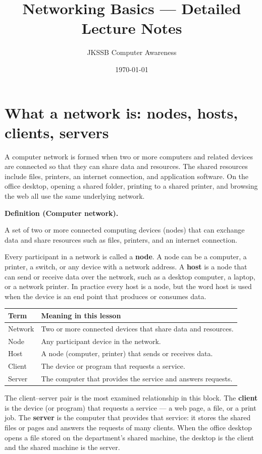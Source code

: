 \documentclass[11pt]{article}
\title{Networking Basics --- Detailed Lecture Notes}
\author{JKSSB Computer Awareness}
\date{\today}
\newenvironment{definitionbox}[1]{%
  \par\noindent\textbf{Definition (#1).}\ \itshape
}{\par\vspace{0.3em}}
\begin{document}
\maketitle

\section{What a network is: nodes, hosts, clients, servers}
A computer network is formed when two or more computers and related devices
are connected so that they can share data and resources. The shared
resources include files, printers, an internet connection, and application
software. On the office desktop, opening a shared folder, printing to a
shared printer, and browsing the web all use the same underlying network.

\begin{definitionbox}{Computer network}
A set of two or more connected computing devices (nodes) that can exchange
data and share resources such as files, printers, and an internet
connection.
\end{definitionbox}

Every participant in a network is called a \textbf{node}. A node can be a
computer, a printer, a switch, or any device with a network address. A
\textbf{host} is a node that can send or receive data over the network, such
as a desktop computer, a laptop, or a network printer. In practice every host
is a node, but the word host is used when the device is an end point that
produces or consumes data.

\begin{center}
\begin{tabular}{p{}p{}}
\toprule
\textbf{Term} & \textbf{Meaning in this lesson} \\
\midrule
Network & Two or more connected devices that share data and resources. \\
Node & Any participant device in the network. \\
Host & A node (computer, printer) that sends or receives data. \\
Client & The device or program that requests a service. \\
Server & The computer that provides the service and answers requests. \\
\bottomrule
\end{tabular}
\end{center}

The client--server pair is the most examined relationship in this block. The
\textbf{client} is the device (or program) that requests a service --- a web
page, a file, or a print job. The \textbf{server} is the computer that
provides that service: it stores the shared files or pages and answers the
requests of many clients. When the office desktop opens a file stored on the
department's shared machine, the desktop is the client and the shared machine
is the server.
\end{document}
